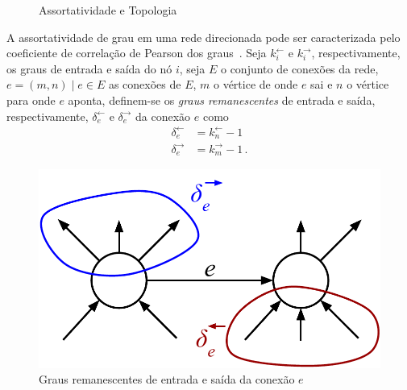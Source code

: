 \documentclass[12pt,a4paper]{article}
\begin{document}
\begin{figure}[ht]
    \centering
    \caption{Assortatividade e Topologia}
    \label{fig:assortatividade-topologia}
\end{figure}

A assortatividade de grau em uma rede direcionada pode ser caracterizada pelo coeficiente de correlação de Pearson dos graus~\cite{Barabasi2016-rn}. Seja $k_i^\leftarrow$ e $k_i^\rightarrow$,  respectivamente, os graus de entrada e saída do nó $i$, seja $E$ o conjunto de conexões da rede, $e = (m, n) \mid e \in E$ as conexões de $E$, $m$ o vértice de onde $e$ sai e $n$ o vértice para onde $e$ aponta, definem-se os \textit{graus remanescentes} de entrada e saída, respectivamente, $\delta_e^\leftarrow$ e $\delta_e^\rightarrow$ da conexão $e$ como
\begin{align*}
\delta_e^\leftarrow &= k_n^\leftarrow - 1
\\
\delta_e^\rightarrow &= k_m^\rightarrow - 1\,.
\end{align*}

\begin{figure}[ht]
    \centering
    \includegraphics[scale=0.4]{remaining-degree.pdf}
    \caption{Graus remanescentes de entrada e saída da conexão $e$}
    \label{fig:remaining-degree}
\end{figure}
\end{document}
